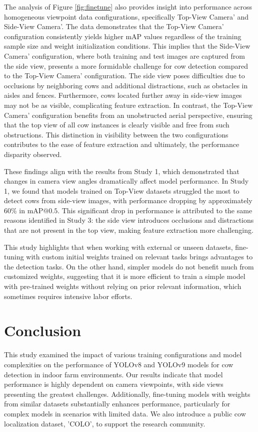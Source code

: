 The analysis of Figure \ref{fig:finetune} also provides insight into performance across homogeneous viewpoint data configurations, specifically Top-View Camera' and Side-View Camera'. The data demonstrates that the Top-View Camera' configuration consistently yields higher mAP values regardless of the training sample size and weight initialization conditions. This implies that the Side-View Camera' configuration, where both training and test images are captured from the side view, presents a more formidable challenge for cow detection compared to the Top-View Camera' configuration. The side view poses difficulties due to occlusions by neighboring cows and additional distractions, such as obstacles in aisles and fences. Furthermore, cows located further away in side-view images may not be as visible, complicating feature extraction. In contrast, the Top-View Camera' configuration benefits from an unobstructed aerial perspective, ensuring that the top view of all cow instances is clearly visible and free from such obstructions. This distinction in visibility between the two configurations contributes to the ease of feature extraction and ultimately, the performance disparity observed.

These findings align with the results from Study 1, which demonstrated that changes in camera view angles dramatically affect model performance. In Study 1, we found that models trained on Top-View datasets struggled the most to detect cows from side-view images, with performance dropping by approximately 60\% in $\text{mAP@{0.5}}$. This significant drop in performance is attributed to the same reasons identified in Study 3: the side view introduces occlusions and distractions that are not present in the top view, making feature extraction more challenging. 

This study highlights that when working with external or unseen datasets, fine-tuning with custom initial weights trained on relevant tasks brings advantages to the detection tasks. On the other hand, simpler models do not benefit much from customized weights, suggesting that it is more efficient to train a simple model with pre-trained weights without relying on prior relevant information, which sometimes requires intensive labor efforts.

\section{Conclusion}
\label{sec:conclusion}

This study examined the impact of various training configurations and model complexities on the performance of YOLOv8 and YOLOv9 models for cow detection in indoor farm environments. Our results indicate that model performance is highly dependent on camera viewpoints, with side views presenting the greatest challenges. Additionally, fine-tuning models with weights from similar datasets substantially enhances performance, particularly for complex models in scenarios with limited data. We also introduce a public cow localization dataset, 'COLO', to support the research community.

